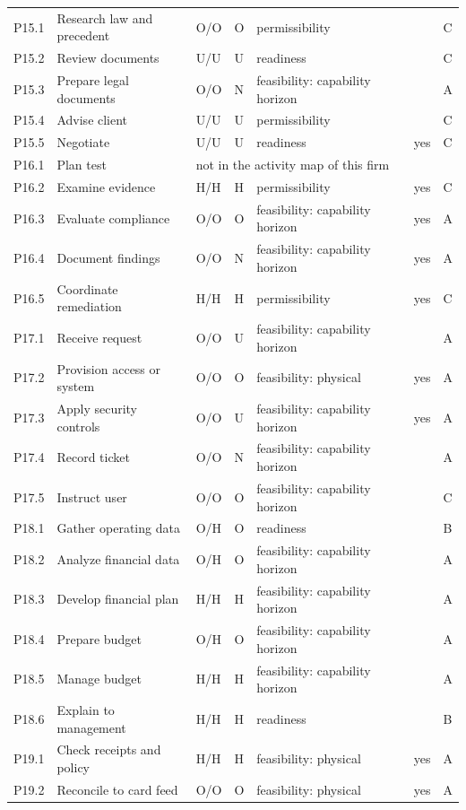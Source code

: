 \begin{longtable}{@{}lp{4.4cm}llp{4.2cm}rll@{}}
P15.1 & Research law and precedent & O/O & O & permissibility &  &  & C \\
P15.2 & Review documents & U/U & U & readiness &  &  & C \\
P15.3 & Prepare legal documents & O/O & N & feasibility: capability horizon &  &  & A \\
P15.4 & Advise client & U/U & U & permissibility &  &  & C \\
P15.5 & Negotiate & U/U & U & readiness &  & yes & C \\
P16.1 & Plan test & \multicolumn{6}{l}{not in the activity map of this firm} \\
P16.2 & Examine evidence & H/H & H & permissibility &  & yes & C \\
P16.3 & Evaluate compliance & O/O & O & feasibility: capability horizon &  & yes & A \\
P16.4 & Document findings & O/O & N & feasibility: capability horizon &  & yes & A \\
P16.5 & Coordinate remediation & H/H & H & permissibility &  & yes & C \\
P17.1 & Receive request & O/O & U & feasibility: capability horizon &  &  & A \\
P17.2 & Provision access or system & O/O & O & feasibility: physical &  & yes & A \\
P17.3 & Apply security controls & O/O & U & feasibility: capability horizon &  & yes & A \\
P17.4 & Record ticket & O/O & N & feasibility: capability horizon &  &  & A \\
P17.5 & Instruct user & O/O & O & feasibility: capability horizon &  &  & C \\
P18.1 & Gather operating data & O/H & O & readiness &  &  & B \\
P18.2 & Analyze financial data & O/H & O & feasibility: capability horizon &  &  & A \\
P18.3 & Develop financial plan & H/H & H & feasibility: capability horizon &  &  & A \\
P18.4 & Prepare budget & O/H & O & feasibility: capability horizon &  &  & A \\
P18.5 & Manage budget & H/H & H & feasibility: capability horizon &  &  & A \\
P18.6 & Explain to management & H/H & H & readiness &  &  & B \\
P19.1 & Check receipts and policy & H/H & H & feasibility: physical &  & yes & A \\
P19.2 & Reconcile to card feed & O/O & O & feasibility: physical &  & yes & A \\

\end{longtable}
